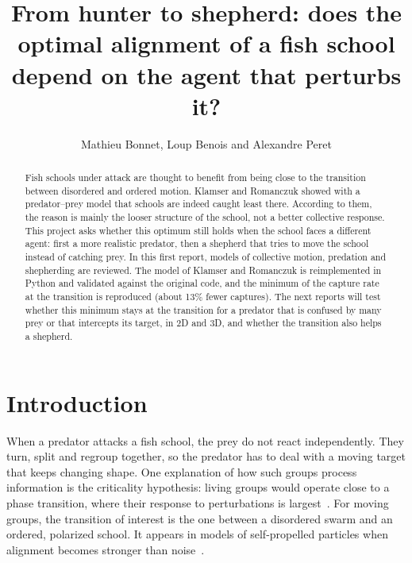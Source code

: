 \documentclass[9pt,twoside]{pnas-new}
\begin{document}
\title{From hunter to shepherd: does the optimal alignment of a fish school depend on the agent that perturbs it?}

\author{Mathieu Bonnet, Loup Benois and Alexandre Peret}


\begin{abstract}
Fish schools under attack are thought to benefit from being close to the transition between
disordered and ordered motion. Klamser and Romanczuk showed with a predator--prey model that schools
are indeed caught least there. According to them, the reason is mainly the looser structure of the school, not a better
collective response. This project asks whether this optimum still holds when the school faces a
different agent: first a more realistic predator, then a shepherd that tries to move the school
instead of catching prey. In this first report, models of collective motion, predation and
shepherding are reviewed. The model of Klamser and Romanczuk is reimplemented in Python and validated
against the original code, and the minimum of the capture rate at the transition is reproduced (about 13\% fewer captures).
The next reports will test whether this minimum stays at the transition for a predator that is confused by many
prey or that intercepts its target, in 2D and 3D, and whether the transition also helps a shepherd.
\end{abstract}


\maketitle
\thispagestyle{firststyle}

\section*{Introduction}

When a predator attacks a fish school, the prey do not react independently. They turn, split and
regroup together, so the predator has to deal with a moving target that keeps changing shape. One
explanation of how such groups process information is the criticality hypothesis: living groups would
operate close to a phase transition, where their response to perturbations is largest~\cite{mora2011,munoz2018}.
For moving groups, the transition of interest is the one between a disordered swarm and an ordered,
polarized school. It appears in models of self-propelled particles when alignment becomes stronger
than noise~\cite{vicsek1995,couzin2002}.
\end{document}
